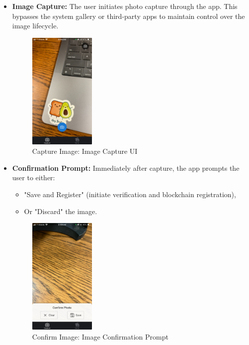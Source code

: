 \begin{itemize}
    \item {\textbf{Image Capture:}} The user initiates photo capture through the app. This bypasses the system gallery or third-party apps to maintain control over the image lifecycle.
    
    \begin{figure}[H]
        \centering
        \includegraphics[width=0.30\textwidth]{images/imageCapture.jpeg}
        \caption{Capture Image: Image Capture UI}
        \label{fig:imageCapture}
    \end{figure}
    
    \item {\textbf{Confirmation Prompt:}} Immediately after capture, the app prompts the user to either:
    \begin{itemize}
        \item "Save and Register" (initiate verification and blockchain registration),
        \item Or "Discard" the image.
    \end{itemize}

    \begin{figure}[H]
        \centering
        \includegraphics[width=0.30\textwidth]{images/confirmationPrompt.jpeg}
        \caption{Confirm Image: Image Confirmation Prompt}
        \label{fig:confirmationPrompt}
    \end{figure}


\end{itemize}
